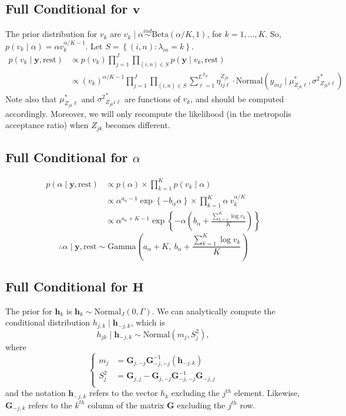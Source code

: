 \documentclass[12pt]{article}
\newcommand{\p}[1]{\left(#1\right)}
\newcommand{\bc}[1]{ \left\{#1\right\} }
\newcommand{\N}{ \mathcal{N} }
\newcommand{\ind}{\overset{ind}{\sim}}
\def\N{\text{Normal}}
\def\G{\text{Gamma}}
\def\Be{\text{Beta}}
\def\lin{\lambda_{in}}
\def\y{\bm{y}}
\def\mus{\mu^*}
\def\sss{{\sigma^2}^*}
\def\rest{\text{rest}}
\def\h{\bm{h}}
\begin{document}
\subsection{\texorpdfstring{Full Conditional for
$\bm v$}{Full Conditional for \textbackslash{}bm v}}\label{full-conditional-for-bm-v}

The prior distribution for $v_k$ are
$v_k \mid \alpha \ind \Be(\alpha/K, 1)$, for $k = 1,...,K$. So,
$p(v_k \mid \alpha) = \alpha v_k^{\alpha/K-1}$.
%
Let $S = \bc{(i,n)\colon \lin = k}$.
%
\begin{align*}
p(v_k \mid \y, \rest) &\propto p(v_k) \prod_{j=1}^J\prod_{(i,n)\in S} p(\y \mid v_k, \rest) \\
&\propto (v_k)^{\alpha/K-1} \prod_{j=1}^J \prod_{(i,n)\in S}
\sum_{\ell=1}^{L^{Z_{jk}}} \eta^{Z_{jk}}_{ij\ell} \cdot
\N(y_{inj} \mid \mus_{Z_{jk}\ell}, \sss_{Z_{jk}i\ell})
\end{align*}
%
%
Note also that $\mus_{Z_{jk}\ell}$ and $\sss_{Z_{jk}i\ell}$ are
functions of $v_k$, and should be computed accordingly. Moreover, we
will only recompute the likelihood (in the metropolis acceptance ratio)
when $Z_{jk}$ becomes different.

\subsection{\texorpdfstring{Full Conditional for
$\alpha$}{Full Conditional for \textbackslash{}alpha}}\label{full-conditional-for-alpha}

\begin{align*}
p(\alpha \mid \y, \rest) &\propto p(\alpha) \times \prod_{k=1}^K p(v_k \mid \alpha) \\
&\propto \alpha^{a_\alpha - 1} \exp\bc{-b_\alpha \alpha} \times \prod_{k=1}^K 
\alpha~v_k^{\alpha/K} \\
&\propto \alpha^{a_\alpha + K -1} \exp\bc{-\alpha\p{b_\alpha + 
\frac{\sum_{k=1}^K \log v_k}{K}}}
\end{align*}
%
$$
\therefore \alpha \mid \y, \rest \sim 
\G\p{a_\alpha + K,~ b_\alpha + \frac{\sum_{k=1}^K \log v_k}{K}}
$$

\subsection{\texorpdfstring{Full Conditional for
$\bm H$}{Full Conditional for \textbackslash{}bm H}}\label{full-conditional-for-bm-h}

The prior for $\h_k$ is $\h_k \sim \N_J(0, \Gamma)$. We can
analytically compute the conditional distribution
$h_{j,k} \mid \h_{-j,k}$, which is
%
$$
h_{jk}  \mid \h_{-j,k} \sim \N(m_j, S^2_j),
$$
%
where
%
$$
\begin{cases}
m_j &= \bm G_{j,-j} \bm G_{-j,-j}^{-1}(\h_{-j,k})\\
S_j^2 &= \bm G_{j,j} - \bm G_{j,-j}\bm G_{-j,-j}^{-1}\bm G_{-j,j}\\
\end{cases}
$$
%
and the notation $\h_{-j,k}$ refers to the vector $h_k$ excluding
the $j^{th}$ element. Likewise, $\bm G_{-j,k}$ refers to the
$k^{th}$ column of the matrix $\bm G$ excluding the $j^{th}$ row.
\end{document}
